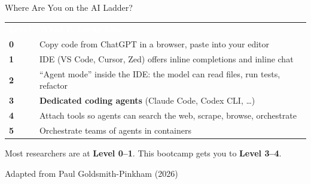 \documentclass[aspectratio=169, 10pt]{beamer}
\begin{document}
\begin{frame}{Where Are You on the AI Ladder?}
\centering
\vskip2pt
{\small
\begin{tabular}{>{\centering\arraybackslash\bfseries}m{1cm} m{12cm}}
\rowcolor{SlateTeal}
\textcolor{white}{Level} & \centering\arraybackslash\textcolor{white}{\textbf{What It Looks Like}} \\[4pt]
\rowcolor{PaleSage}
\textcolor{SlateTeal}{0} & Copy code from ChatGPT in a browser, paste into your editor \\[4pt]
\rowcolor{white}
\textcolor{SlateTeal}{1} & IDE (VS Code, Cursor, Zed) offers inline completions and inline chat \\[4pt]
\rowcolor{PaleSage}
\textcolor{SlateTeal}{2} & ``Agent mode'' inside the IDE: the model can read files, run tests, refactor \\[4pt]
\rowcolor{white}
\textcolor{SlateTeal}{3} & \textbf{Dedicated coding agents} (Claude Code, Codex CLI, \ldots) \\[4pt]
\rowcolor{PaleSage}
\textcolor{SlateTeal}{4} & Attach tools so agents can search the web, scrape, browse, orchestrate \\[4pt]
\rowcolor{white}
\textcolor{SlateTeal}{5} & Orchestrate teams of agents in containers \\[4pt]
\end{tabular}
}
\vskip8pt
\pause
\begin{tcolorbox}[accentbox, width=10cm, halign=center]
\small Most researchers are at \textbf{Level 0--1}. This bootcamp gets you to \textbf{Level 3--4}.
\end{tcolorbox}
\vskip2pt
{\scriptsize\color{CoolGray} Adapted from Paul Goldsmith-Pinkham (2026)}
\end{frame}
\end{document}
